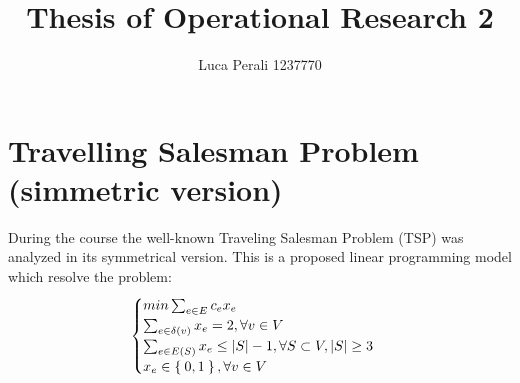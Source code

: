 \documentclass[12pt]{article}
\begin{document}
\title{Thesis of Operational Research 2}
\author{Luca Perali 1237770}



\section{Travelling Salesman Problem (simmetric version)}
During the course the well-known Traveling Salesman Problem (TSP) was analyzed in its symmetrical version.
This is a proposed linear programming model which resolve the problem:
\[
\begin{cases}
min \sum_{ e\in E } c_ex_e \\
\sum_{e\in \delta (v) } x_e = 2, \forall v \in V \\
\sum_{e\in E(S) } x_e \le |S|-1, \forall S \subset V, |S| \ge 3 \\
x_e \in \Set{0,1}, \forall v \in V
\end{cases}
\]

\cite{}



\end{document}
